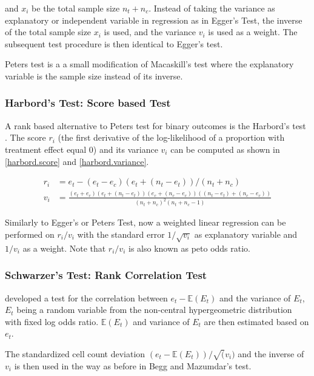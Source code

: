 \documentclass[11pt,a4paper,twoside]{book}\usepackage[]{graphicx}\usepackage[]{color}
\begin{document}
and $x_{i}$ be the total sample size $n_{t} + n_{c}$. Instead of taking the variance as explanatory or independent variable in regression as in Egger's Test, the inverse of the total sample size $x_{i}$ is used, and the variance $v_{i}$ is used as a weight. The subsequent test procedure is then identical to Egger's test. 

\vspace{0mm}
Peters test is a a small modification of Macaskill's test where the explanatory variable is the sample size instead of its inverse.


\subsubsection{Harbord's Test: Score based Test}
A rank based alternative to Peters test for binary outcomes is the Harbord's test \citep{Harbord}. The score $r_{i}$ (the first derivative of the log-likelihood of a proportion with treatment effect equal 0) and its variance $v_{i}$ can be computed as shown in \ref{harbord.score} and \ref{harbord.variance}.

\begin{align}
r_{i} &= e_{t} - (e_{t} - e_{c})(e_{t} + (n_{t} - e_{t}))/(n_{t} + n_{c}) \label{harbord.score} \\
v_{i} &= \frac{(e_{t} + e_{c})(e_{t} + (n_{t} - e_{t}))(e_{c} + (n_{c} - e_{c}))((n_{t} - e_{t}) + (n_{c} - e_{c}))}{(n_{t} + n_{c})^2(n_{t} + n_{c} - 1)} \label{harbord.variance}
\end{align}

Similarly to Egger's or Peters Test, now a weighted linear regression can be performed on $r_{i}/v_{i}$ with the standard error $1/\sqrt{v_{i}}$ as explanatory variable and $1/v_{i}$ as a weight. Note that $r_{i}/v_{i}$ is also known as peto odds ratio. 

\subsubsection{Schwarzer's Test: Rank Correlation Test}
\citet{Schwarzer} developed a test for the correlation between $e_{t} - \mathbb{E}(E_{t})$ and the variance of $E_{t}$, $E_{t}$ being a random variable from the non-central hypergeometric distribution with fixed log odds ratio. $\mathbb{E}(E_{t})$ and variance of $E_{t}$ are then estimated based on $e_{t}$.

\vspace{0mm}
The standardized cell count deviation $(e_{t} - \mathbb{E}(E_{t}))/\sqrt(v_{i})$ and the inverse of $v_{i}$ is then used in the way as before in Begg and Mazumdar's test.
\end{document}
